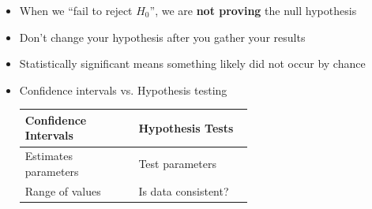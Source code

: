 \documentclass[../mathNotesPreamble]{subfiles}
\begin{document}
  \begin{thmBox*}
    \begin{itemize}
      \setlength{\itemsep}{0.75\baselineskip}
      \item When we ``fail to reject $H_0$'', we are \textbf{not proving} the null hypothesis
      \item Don't change your hypothesis after you gather your results
      \item Statistically significant means something likely did not occur by chance
      \item Confidence intervals vs. Hypothesis testing
        \begin{center}
          \begin{tabular}{@{}*{2}{M{0.3\linewidth}}@{}}\toprule
            Confidence Intervals& Hypothesis Tests\\\midrule
            Estimates parameters& Test parameters\\
            Range of values& Is data consistent?\\\bottomrule
          \end{tabular}
        \end{center}
    \end{itemize}
  \end{thmBox*}

  \pagebreak
\end{document}

